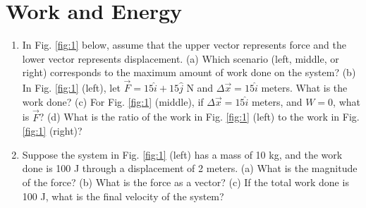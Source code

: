 \documentclass{article}
\begin{document}
\section{Work and Energy}

\begin{enumerate}
\item In Fig. \ref{fig:1} below, assume that the upper vector represents force and the lower vector represents displacement. (a) Which scenario (left, middle, or right) corresponds to the maximum amount of work done on the system? (b) In Fig. \ref{fig:1} (left), let $\vec{F} = 15\hat{i} + 15\hat{j}$ N and $\Delta \vec{x} = 15\hat{i}$ meters.  What is the work done? (c) For Fig. \ref{fig:1} (middle), if $\Delta \vec{x} = 15\hat{i}$ meters, and $W = 0$, what is $\vec{F}$? (d) What is the ratio of the work in Fig. \ref{fig:1} (left) to the work in Fig. \ref{fig:1} (right)? \\ \vspace{2cm}
\item Suppose the system in Fig. \ref{fig:1} (left) has a mass of 10 kg, and the work done is 100 J through a displacement of 2 meters.  (a) What is the magnitude of the force? (b) What is the force as a vector? (c) If the total work done is 100 J, what is the final velocity of the system?
\end{enumerate}
\end{document}

